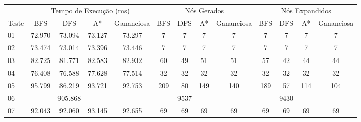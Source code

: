 \documentclass[12pt,a4paper]{article}
\begin{document}
\vspace*{1cm}

\begin{adjustbox}{width={\textwidth}, totalheight={\textheight}, keepaspectratio}
      \begin{tabular}{l cccc cccc cccc}
            \toprule
                  & \multicolumn{4}{c}{Tempo de Execução (ms)} & \multicolumn{4}{c}{Nós Gerados} & \multicolumn{4}{c}{Nós Expandidos}                                                                              \\
            \cmidrule(lr){2-5} \cmidrule(lr){6-9} \cmidrule(lr){10-13}
            Teste & BFS                                        & DFS                             & A*                                 & Gananciosa & BFS & DFS  & A*  & Gananciosa & BFS & DFS  & A*  & Gananciosa \\
            \midrule
            01    & 72.970                                     & 73.094                          & 73.127                             & 73.297     & 7   & 7    & 7   & 7          & 7   & 7    & 7   & 7          \\
            02    & 73.474                                     & 73.014                          & 73.396                             & 73.446     & 7   & 7    & 7   & 7          & 7   & 7    & 7   & 7          \\
            03    & 82.725                                     & 81.771                          & 82.583                             & 82.932     & 60  & 49   & 51  & 51         & 57  & 42   & 44  & 44         \\
            04    & 76.408                                     & 76.588                          & 77.628                             & 77.514     & 32  & 32   & 32  & 32         & 32  & 32   & 32  & 32         \\
            05    & 95.799                                     & 86.219                          & 93.721                             & 92.753     & 209 & 80   & 149 & 140        & 189 & 57   & 114 & 104        \\
            06    & -                                          & 905.868                         & -                                  & -          & -   & 9537 & -   & -          & -   & 9430 & -   & -          \\
            07    & 92.043                                     & 92.060                          & 93.145                             & 92.655     & 69  & 69   & 69  & 69         & 69  & 69   & 69  & 69         \\

\end{tabular}
\end{adjustbox}
\end{document}
